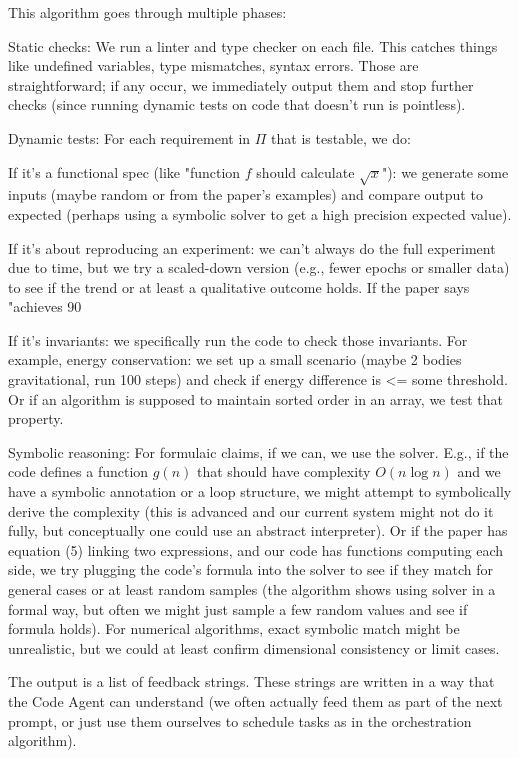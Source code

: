 \documentclass{ieeeaccess}
\begin{document}
This algorithm goes through multiple phases:

Static checks: We run a linter and type checker on each file. This catches things like undefined variables, type mismatches, syntax errors. Those are straightforward; if any occur, we immediately output them and stop further checks (since running dynamic tests on code that doesn't run is pointless).

Dynamic tests: For each requirement in $\Pi$ that is testable, we do:

If it's a functional spec (like "function $f$ should calculate $\sqrt{x}$"): we generate some inputs (maybe random or from the paper's examples) and compare output to expected (perhaps using a symbolic solver to get a high precision expected value).

If it's about reproducing an experiment: we can't always do the full experiment due to time, but we try a scaled-down version (e.g., fewer epochs or smaller data) to see if the trend or at least a qualitative outcome holds. If the paper says "achieves 90%

If it's invariants: we specifically run the code to check those invariants. For example, energy conservation: we set up a small scenario (maybe 2 bodies gravitational, run 100 steps) and check if energy difference is <= some threshold. Or if an algorithm is supposed to maintain sorted order in an array, we test that property.

Symbolic reasoning: For formulaic claims, if we can, we use the solver. E.g., if the code defines a function $g(n)$ that should have complexity $O(n \log n)$ and we have a symbolic annotation or a loop structure, we might attempt to symbolically derive the complexity (this is advanced and our current system might not do it fully, but conceptually one could use an abstract interpreter).
Or if the paper has equation (5) linking two expressions, and our code has functions computing each side, we try plugging the code's formula into the solver to see if they match for general cases or at least random samples (the algorithm shows using solver in a formal way, but often we might just sample a few random values and see if formula holds).
For numerical algorithms, exact symbolic match might be unrealistic, but we could at least confirm dimensional consistency or limit cases.

The output is a list of feedback strings. These strings are written in a way that the Code Agent can understand (we often actually feed them as part of the next prompt, or just use them ourselves to schedule tasks as in the orchestration algorithm).
\end{document}
